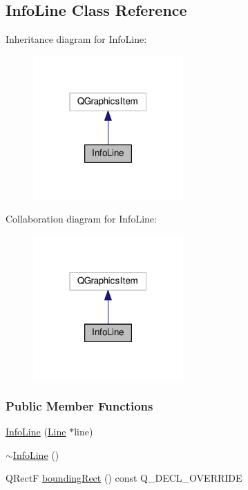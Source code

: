 \hypertarget{class_info_line}{}\subsection{Info\+Line Class Reference}
\label{class_info_line}


Inheritance diagram for Info\+Line\+:
\nopagebreak
\begin{figure}[H]
\begin{center}
\leavevmode
\includegraphics[width=163pt]{class_info_line__inherit__graph}
\end{center}
\end{figure}


Collaboration diagram for Info\+Line\+:
\nopagebreak
\begin{figure}[H]
\begin{center}
\leavevmode
\includegraphics[width=163pt]{class_info_line__coll__graph}
\end{center}
\end{figure}
\subsubsection*{Public Member Functions}
\begin{DoxyCompactItemize}
\item 
\hyperlink{class_info_line_a63819dbfeb257cc86be86f0fac3aa02f}{Info\+Line} (\hyperlink{class_line}{Line} $\ast$line)
\item 
\hyperlink{class_info_line_ac3497eeb5f2719fb4fac42434955597d}{$\sim$\+Info\+Line} ()
\item 
Q\+Rect\+F \hyperlink{class_info_line_a3103eee5d5a8b4fd53d428f9aea01830}{bounding\+Rect} () const Q\+\_\+\+D\+E\+C\+L\+\_\+\+O\+V\+E\+R\+R\+I\+D\+E
\end{DoxyCompactItemize}
